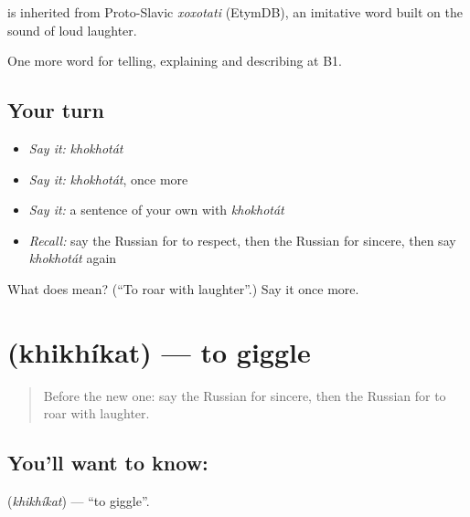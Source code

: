 \begin{cousinweb}
\emph{} is inherited from Proto-Slavic \emph{xoxotati} (EtymDB), an imitative word built on the sound of loud laughter.
\end{cousinweb}

\begin{grammarlens}[title={What you've built}]
One more word for telling, explaining and describing at B1.
\end{grammarlens}

\subsection*{Your turn}
\begin{itemize}
\raggedright
  \item \emph{Say it:} \emph{khokhotát}
  \item \emph{Say it:} \emph{khokhotát}, once more
  \item \emph{Say it:} a sentence of your own with \emph{khokhotát}
  \item \emph{Recall:} say the Russian for to respect, then the Russian for sincere, then say \emph{khokhotát} again
\end{itemize}

\begin{tcolorbox}[breakable,colback=teal!4,colframe=teal!35!black,title={Before you move on}]
What does  mean? (\textquotedblleft{}To roar with laughter\textquotedblright{}.) Say it once more.
\end{tcolorbox}
\section[\texorpdfstring{\ru{хихикать} (khikhíkat)}{хихикать (khikhíkat)}]{ (khikhíkat) — to giggle}

\label{lesson:RU-C480-khikhikat}



\begin{quote}
Before the new one: say the Russian for sincere, then the Russian for to roar with laughter.
\end{quote}

\subsection*{You'll want to know: }
\textbf{} (\emph{khikhíkat}) — \textquotedblleft{}to giggle\textquotedblright{}.

